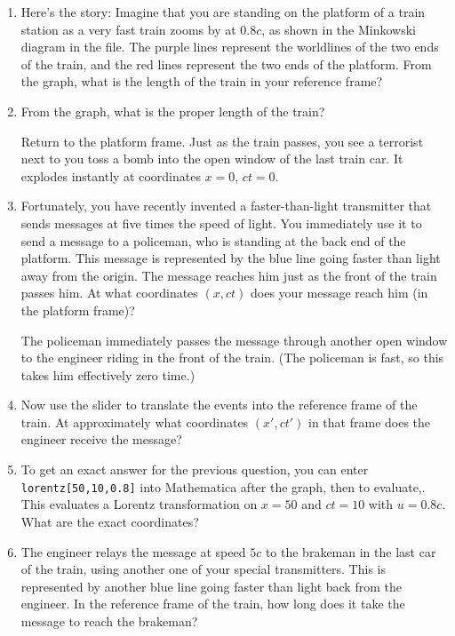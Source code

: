 \begin{enumerate}[wide]
\item Here's the story: Imagine that you are standing on the platform of a train station as a
very fast train zooms by at $0.8c$, as shown in the Minkowski diagram in the file. The purple lines represent the worldlines of the two ends of the train, and the red lines represent the two ends of the platform. From the graph, what is the length of the train in your reference frame?
\answerspace{0.7in}

\item From the graph, what is the proper length of the train?
\answerspace{0.7in}

Return to the platform frame.  Just as the train passes, you see a terrorist next to you toss a bomb into the open window of the last train car. It explodes instantly at coordinates $x = 0$, $ct = 0$.

\item Fortunately, you have recently invented a faster-than-light transmitter that sends messages at five times the speed of light. You immediately use it to send a message to a policeman, who is standing at the back end of the platform. This message is represented by the blue line going faster than light away from the origin.  The message reaches him just as the front of the train passes him. At what coordinates $(x,ct)$ does your message reach him (in the platform frame)?
\answerspace{0.7in}

The policeman immediately passes the message through another open window to the engineer riding in the front of the train. (The policeman is fast, so this takes him effectively zero time.)

\item Now use the slider to translate the events into the reference frame of the train. At approximately what coordinates 
$(x', ct')$ in that frame does the engineer receive the message?
\answerspace{0.7in}

\item To get an exact answer for the previous question, you can enter \verb!lorentz[50,10,0.8]!
into Mathematica after the graph, then  to evaluate,.  This evaluates a Lorentz transformation on $x=50$ and $ct=10$ with $u=0.8c$.  What are the exact coordinates?
\answerspace{0.7in}

\item The engineer relays the message at speed $5c$ to the brakeman in the last car of the train, using another one of your special transmitters. This is represented by another blue line going faster than light back from the engineer.  In the reference frame of the train, how long does it take the message to reach the brakeman?
\answerspace{0.7in}


\end{enumerate}
